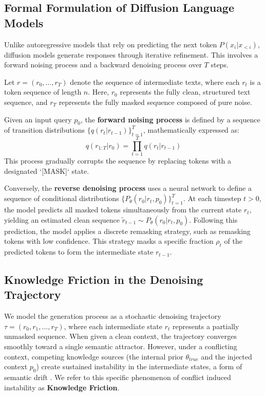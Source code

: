 \documentclass[11pt]{article}
\begin{document}
\subsection{Formal Formulation of Diffusion Language Models}
Unlike autoregressive models that rely on predicting the next token $P(x_i | x_{<i})$, diffusion models generate responses through iterative refinement. This involves a forward noising process and a backward denoising process over $T$ steps.

Let $r = (r_0, \dots, r_T)$ denote the sequence of intermediate texts, where each $r_t$ is a token sequence of length $n$. Here, $r_0$ represents the fully clean, structured text sequence, and $r_T$ represents the fully masked sequence composed of pure noise.

Given an input query $p_0$, the \textbf{forward noising process} is defined by a sequence of transition distributions $\{q(r_t | r_{t-1})\}_{t=1}^T$, mathematically expressed as:
\begin{equation}
    q(r_{1:T} | r_0) = \prod_{t=1}^T q(r_t | r_{t-1})
\end{equation}
This process gradually corrupts the sequence by replacing tokens with a designated `[MASK]` state.

Conversely, the \textbf{reverse denoising process} uses a neural network to define a sequence of conditional distributions $\{P_\theta(r_0 | r_t, p_0)\}_{t=1}^T$. At each timestep $t > 0$, the model predicts all masked tokens simultaneously from the current state $r_t$, yielding an estimated clean sequence $\tilde{r}_{t-1} \sim P_\theta(r_0 | r_t, p_0)$. Following this prediction, the model applies a discrete remasking strategy, such as remasking tokens with low confidence. This strategy masks a specific fraction $\rho_t$ of the predicted tokens to form the intermediate state $r_{t-1}$.

\subsection{Knowledge Friction in the Denoising Trajectory}
We model the generation process as a stochastic denoising trajectory $\tau = (r_0, r_1, \dots, r_T)$, where each intermediate state $r_t$ represents a partially unmasked sequence. When given a clean context, the trajectory converges smoothly toward a single semantic attractor. However, under a conflicting context, competing knowledge sources (the internal prior $\theta_{true}$ and the injected context $p_0$) create sustained instability in the intermediate states, a form of semantic drift \citep{spread2026}. We refer to this specific phenomenon of conflict induced instability as \textbf{Knowledge Friction}.
\end{document}
